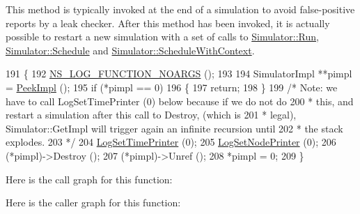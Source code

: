 This method is typically invoked at the end of a simulation to avoid false-\/positive reports by a leak checker. After this method has been invoked, it is actually possible to restart a new simulation with a set of calls to \hyperlink{classns3_1_1Simulator_a84be982e6d03b62c3dc3303c75a9b909}{Simulator\+::\+Run}, \hyperlink{classns3_1_1Simulator_a671882c894a08af4a5e91181bf1eec13}{Simulator\+::\+Schedule} and \hyperlink{classns3_1_1Simulator_a86dbaef45a15a42365d7d2ae550449f6}{Simulator\+::\+Schedule\+With\+Context}. 
\begin{DoxyCode}
191 \{
192   \hyperlink{log-macros-disabled_8h_a8f7e4afc291c9d29a65c18ac1f79197b}{NS\_LOG\_FUNCTION\_NOARGS} ();
193 
194   SimulatorImpl **pimpl = \hyperlink{group__simulator_ga233c5c38de117e4e4a5a9cd168694792}{PeekImpl} (); 
195   \textcolor{keywordflow}{if} (*pimpl == 0)
196     \{
197       \textcolor{keywordflow}{return};
198     \}
199   \textcolor{comment}{/* Note: we have to call LogSetTimePrinter (0) below because if we do not do}
200 \textcolor{comment}{   * this, and restart a simulation after this call to Destroy, (which is }
201 \textcolor{comment}{   * legal), Simulator::GetImpl will trigger again an infinite recursion until}
202 \textcolor{comment}{   * the stack explodes.}
203 \textcolor{comment}{   */}
204   \hyperlink{namespacens3_acf6a1749b3febc5a6a5b2b8620138d80}{LogSetTimePrinter} (0);
205   \hyperlink{namespacens3_aa6e659ca357c8309352fa0f146793810}{LogSetNodePrinter} (0);
206   (*pimpl)->Destroy ();
207   (*pimpl)->Unref ();
208   *pimpl = 0;
209 \}
\end{DoxyCode}


Here is the call graph for this function\+:




Here is the caller graph for this function\+:


